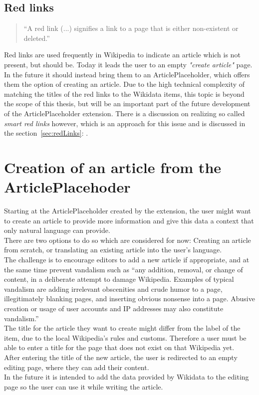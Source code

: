 \subsection{Red links}
\begin{quotation}
``A red link (...) signifies a link to a page that is either non-existent or deleted.'' \citep{wiki:01} 
\end{quotation}

Red links are used frequently in Wikipedia to indicate an article which is not present, but should be. Today it leads the user to an empty \textit{"create article"} page. In the future it should instead bring them to an ArticlePlaceholder, which offers them the option of creating an article. Due to the high technical complexity of matching the titles of the red links to the Wikidata items, this topic is beyond the scope of this thesis, but will be an important part of the future development of the ArticlePlaceholder extension. There is a discussion on realizing so called \textit{smart red links} however, which is an approach for this issue and is discussed in the section~\ref{sec:redLinks}: .

\section{Creation of an article from the ArticlePlacehoder}
Starting at the ArticlePlaceholder created by the extension, the user might want to create an article to provide more information and give this data a context that only natural language can provide. \\
There are two options to do so which are considered for now: Creating an article from scratch, or translating an existing article into the user's language. \\
The challenge is to encourage editors to add a new article if appropriate, and at the same time prevent vandalism such as ``any addition, removal, or change of content, in a deliberate attempt to damage Wikipedia. Examples of typical vandalism are adding irrelevant obscenities and crude humor to a page, illegitimately blanking pages, and inserting obvious nonsense into a page. Abusive creation or usage of user accounts and IP addresses may also constitute vandalism.'' \citep{wiki:33} \\ 
The title for the article they want to create might differ from the label of the item, due to the local Wikipedia's rules and customs. Therefore a user must be able to enter a title for the page that does not exist on that Wikipedia yet. \\
After entering the title of the new article, the user is redirected to an empty editing page, where they can add their content. \\
In the future it is intended to add the data provided by Wikidata to the editing page so the user can use it while writing the article. 

